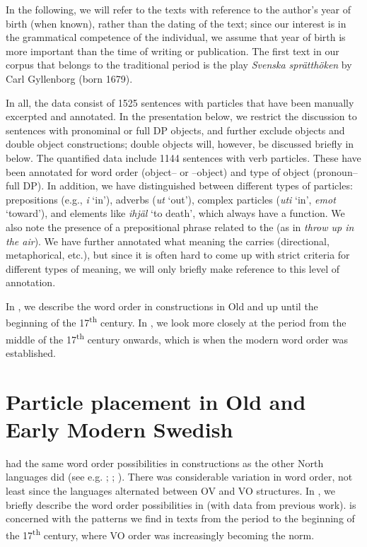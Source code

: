 \documentclass[output=paper]{langscibook}
\begin{document}
In the following, we will refer to the texts with reference to the author’s year of birth (when known), rather than the dating of the text; since our interest is in the grammatical competence of the individual, we assume that year of birth is more important than the time of writing or publication. The first text in our corpus that belongs to the traditional  period is the play \textit{Svenska sprätthöken} by Carl Gyllenborg (born 1679). 



In all, the data consist of 1525 sentences with particles that have been manually excerpted and annotated. In the presentation below, we restrict the discussion to sentences with pronominal or full DP objects, and further exclude  objects and double object constructions; double objects will, however, be discussed briefly in  below. The quantified data include 1144 sentences with verb particles. These have been annotated for word order (object– or –object) and type of object (pronoun–full DP). In addition, we have distinguished between different types of particles: prepositions (e.g., \textit{i} ‘in’), adverbs (\textit{ut} ‘out’), complex particles (\textit{uti} ‘in’, \textit{emot} ‘toward’), and elements like \textit{ihjäl} ‘to death’, which always have a  function. We also note the presence of a prepositional phrase related to the  (as in \textit{throw up in the air}). We have further annotated what meaning the  carries (directional, metaphorical, etc.), but since it is often hard to come up with strict criteria for different types of meaning, we will only briefly make reference to this level of annotation.



In , we describe the word order in  constructions in Old and  up until the beginning of the 17\textsuperscript{th} century. In , we look more closely at the period from the middle of the 17\textsuperscript{th} century onwards, which is when the modern word order was established.


\section{Particle placement in Old and Early Modern Swedish}\label{sec:lalu:4}


 had the same word order possibilities in  constructions as the other North  languages did (see e.g. \citealt{Ljunggren1932}; \citealt{Diderichsen1941}; \citealt{Hroarsdottir2008}). There was considerable variation in word order, not least since the languages alternated between OV and VO structures. In , we briefly describe the word order possibilities in  (with data from previous work).  is concerned with the patterns we find in texts from the  period to the beginning of the 17\textsuperscript{th} century, where VO order was increasingly becoming the norm.
\end{document}
